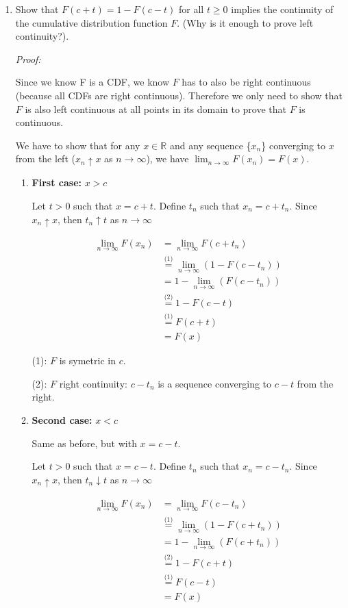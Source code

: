 \documentclass[12pt]{article}
\begin{document}
\begin{enumerate}
    \item Show that $F(c+t)=1-F(c-t)$ for all $t \geq 0$ implies the continuity of the cumulative distribution function $F$. (Why is it enough to prove left continuity?).
     
    \textit{Proof:}

Since we know F is a CDF, we know $F$ has to also be right continuous (because all CDFs are right continuous).  Therefore we only need to show that $F$ is also left continuous at all points in its domain to prove that $F$ is continuous.

We have to show that for any $x \in \mathbb{R}$ and any sequence \{$x_n$\} converging to $x$ from the left (\( x_n \uparrow x \) as \( n \to \infty \)), we have $\lim_{n \to \infty} F(x_n) = F(x)$.

\begin{enumerate}
    \item \textbf{First case:} $x > c$ 
    
    Let $t>0$ such that $x= c+t$. Define $t_n$ such that $x_n=c+t_n$. Since $x_n \uparrow x$, then  \( t_n \uparrow t \) as \( n \to \infty \) 

    \begin{align*}
        \lim_{n \to \infty} F(x_n) &= \lim_{n \to \infty} F(c+t_n)\\
        &\stackrel{\text{(1)}}{=} \lim_{n \to \infty} (1-F(c-t_n))\\
        &= 1-\lim_{n \to \infty} (F(c-t_n))\\
        &\stackrel{\text{(2)}}{=} 1-F(c-t)\\
        &\stackrel{\text{(1)}}{=} F(c+t)\\
        &= F(x)
    \end{align*}

(1): $F$ is symetric in $c$.

(2): $F$ right continuity: $c-t_n$ is a sequence converging to $c-t$ from the right. 

\item \textbf{Second case:} $x < c$

Same as before, but with $x=c-t$.

Let $t>0$ such that $x= c-t$. Define $t_n$ such that $x_n=c-t_n$. Since $x_n \uparrow x$, then  \( t_n \downarrow t \) as \( n \to \infty \) 

\begin{align*}
    \lim_{n \to \infty} F(x_n) &= \lim_{n \to \infty} F(c-t_n)\\
    &\stackrel{\text{(1)}}{=} \lim_{n \to \infty} (1-F(c+t_n))\\
    &= 1-\lim_{n \to \infty} (F(c+t_n))\\
    &\stackrel{\text{(2)}}{=} 1-F(c+t)\\
    &\stackrel{\text{(1)}}{=} F(c-t)\\
    &= F(x)
\end{align*}


\end{enumerate}
\end{enumerate}
\end{document}
